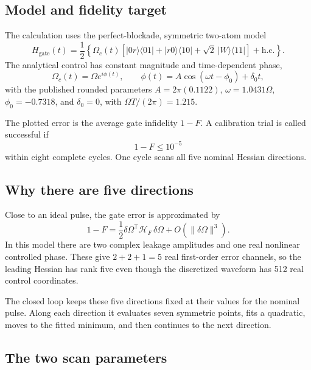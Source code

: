 \documentclass[11pt]{article}
\newcommand{\infid}{1-F}
\newcommand{\Om}{\Omega}
\newcommand{\dOm}{\delta\Omega}
\newcommand{\target}{10^{-5}}
\newcommand{\Hgate}{H_{\mathrm{gate}}}
\newcommand{\Hess}{\mathcal{H}_{F}}
\begin{document}
\subsection{Model and fidelity target}

The calculation uses the perfect-blockade, symmetric two-atom model
\begin{equation}
\Hgate(t)=\frac{1}{2}\left\{
\Om_c(t)\left[
|0r\rangle\langle 01|
+|r0\rangle\langle 10|
+\sqrt{2}\,|W\rangle\langle 11|
\right]+\mathrm{h.c.}\right\}.
\end{equation}
The analytical control has constant magnitude and time-dependent phase,
\begin{equation}
\Om_c(t)=\Om e^{i\phi(t)},\qquad
\phi(t)=A\cos(\omega t-\phi_0)+\delta_0t,
\end{equation}
with the published rounded parameters
$A=2\pi(0.1122)$, $\omega=1.0431\Om$, $\phi_0=-0.7318$, and
$\delta_0=0$, with $\Om T/(2\pi)=1.215$.

The plotted error is the average gate infidelity $\infid$.  A calibration
trial is called successful if
\begin{equation}
\infid\leq\target
\end{equation}
within eight complete cycles.  One cycle scans all five nominal Hessian
directions.

\subsection{Why there are five directions}

Close to an ideal pulse, the gate error is approximated by
\begin{equation}
\infid
=\frac{1}{2}\dOm^{\mathsf T}\Hess\,\dOm
+O(\|\dOm\|^3).
\end{equation}
In this model there are two complex leakage amplitudes and one real nonlinear
controlled phase.  These give $2+2+1=5$ real first-order error channels, so
the leading Hessian has rank five even though the discretized waveform has
512 real control coordinates.

The closed loop keeps these five directions fixed at their values for the
nominal pulse.  Along each direction it evaluates seven symmetric points,
fits a quadratic, moves to the fitted minimum, and then continues to the next
direction.

\subsection{The two scan parameters}
\end{document}
